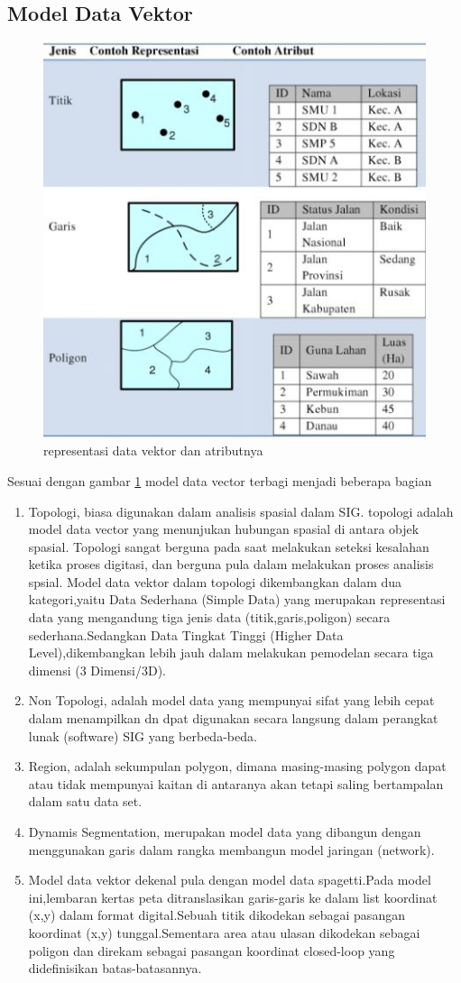 \subsection{Model Data Vektor}
\begin{figure}[ht]
\centerline{\includegraphics[width=.5\textwidth] {figures/vektor03.JPG}}
\caption{representasi data vektor dan atributnya}
\label{vektor03}
\end{figure}
Sesuai dengan gambar \ref{vektor03} model data vector terbagi menjadi beberapa bagian
\begin{enumerate} 
\item Topologi, biasa digunakan dalam analisis spasial dalam SIG. topologi adalah model data vector yang menunjukan hubungan spasial di antara objek spasial. Topologi sangat berguna pada saat melakukan seteksi kesalahan ketika proses digitasi, dan berguna pula dalam melakukan proses analisis spsial.
Model data vektor dalam topologi dikembangkan dalam dua kategori,yaitu Data Sederhana (Simple Data) yang merupakan representasi data yang mengandung tiga jenis data (titik,garis,poligon) secara sederhana.Sedangkan Data Tingkat Tinggi (Higher Data Level),dikembangkan lebih jauh dalam melakukan pemodelan secara tiga dimensi (3 Dimensi/3D).
\item Non Topologi, adalah model data yang mempunyai sifat yang lebih cepat dalam menampilkan dn dpat digunakan secara langsung dalam perangkat lunak (software) SIG yang berbeda-beda.
\item Region, adalah sekumpulan polygon, dimana masing-masing polygon dapat atau tidak mempunyai kaitan di antaranya akan tetapi saling bertampalan dalam satu data set.
\item Dynamis Segmentation, merupakan model data yang dibangun dengan menggunakan garis dalam rangka membangun model jaringan (network).
\item Model data vektor dekenal pula dengan model data spagetti.Pada model ini,lembaran kertas peta ditranslasikan garis-garis 
ke dalam list koordinat (x,y) dalam format digital.Sebuah titik dikodekan sebagai pasangan koordinat (x,y) tunggal.Sementara area atau ulasan dikodekan sebagai poligon dan direkam sebagai pasangan koordinat closed-loop yang didefinisikan batas-batasannya.
\end{enumerate}
\cite{Janner2010rekayasa}

